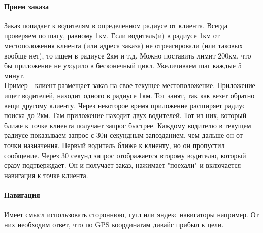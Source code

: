 \documentclass[DIV=calc, paper=a4, fontsize=11pt]{scrartcl} %
\begin{document}
\paragraph{Прием заказа}
Заказ попадает к водителям в определенном радиусе от клиента. Всегда проверяем по шагу, равному 1км. Если водитель(и) в радиусе 1км от местоположения клиента (или адреса заказа) не отреагировали (или таковых вообще нет), то ищем в радиусе 2км и т.д. Можно поставить лимит 200км, что бы приложение не уходило в бесконечный цикл. Увеличиваем шаг каждые 5 минут.
\\[0.5cm]
Пример - клиент размещает заказ на свое текущее местоположение. Приложение ищет водителей, находит одного в радиусе 1км. Тот занят, так как везет обратно вещи другому клиенту. Через некоторое время приложение расширяет радиус поиска до 2км. Там приложение находит двух водителей. Тот из них, который ближе к точке клиента получает запрос быстрее. Каждому водителю в текущем радиусе показываем запрос с 30и секундным запозданием, чем дальше он от точки назначения. Первый водитель ближе к клиенту, но он пропустил сообщение. Через 30 секунд запрос отображается второму водителю, который сразу подтверждает. Он и получает заказ, нажимает "поехали" и включается навигация к точке клиента.

\paragraph{Навигация}
Имеет смысл использовать стороннюю, гугл или яндекс навигаторы например. От них необходим ответ, что по GPS координатам дивайс прибыл к цели.
\end{document}
